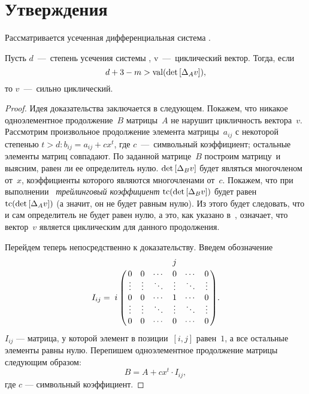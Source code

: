 \section{Утверждения}

Рассматривается усеченная дифференциальная система .

\begin{proposition}
Пусть $d$~---~степень усечения системы , v~---~циклический вектор. Тогда, если
\begin{equation}
	d + 3 - m > \mathop{\rm val}(\mathop{\rm det}\text{$ [\Delta_A v] $}),
	\label{d3m}
\end{equation}
то $v$~---~сильно циклический.

\end{proposition}

\begin{proof}

Идея доказательства заключается в следующем.
Покажем, что никакое одноэлементное продолжение~$B$ матрицы~$A$ не нарушит цикличность вектора~$v$.
Рассмотрим произвольное продолжение элемента матрицы~$a_{ij}$ с некоторой степенью $t > d: b_{ij} = a_{ij} + cx^t$,
где $c$~---~символьный коэффициент; остальные элементы матриц совпадают.
По заданной матрице~$B$ построим матрицу~\diffMatrix[B] и выясним, равен ли ее определитель нулю.
$\mathop{\rm det} \text{$ [\Delta_B v] $}$ будет являться многочленом от~$x$, коэффициенты которого являются многочленами от~$c$.
Покажем, что при выполнении~ \textit{трейлинговый коэффициент} $\mathop{\rm tc} (\mathop{\rm det} \text{$ [\Delta_B v] $})$ будет равен $\mathop{\rm tc} (\mathop{\rm det} \text{$ [\Delta_A v] $})$
(а значит, он не будет равным нулю).
Из этого будет следовать, что и сам определитель не будет равен нулю, а это, как указано в~, означает, что вектор~$v$ является циклическим для данного продолжения.
\medskip

Перейдем теперь непосредственно к доказательству.
Введем обозначение
\begin{equation*}
	I_{ij} = 
	\bordermatrix{
		&           &         &        & j      &        &        \cr
		&   0       & 0       & \cdots & 0      & \cdots & 0      \cr
		&   \vdots  & \vdots  & \ddots & \vdots & \ddots & \vdots \cr
		i & 0       & 0       & \cdots & 1      & \cdots & 0      \cr
		&   \vdots  & \vdots  & \ddots & \vdots & \ddots & \vdots \cr
		&   0       & 0       & \cdots & 0      & \cdots & 0      \cr
	}.
\end{equation*}
$I_{ij}$ --- матрица, у которой элемент в позиции~$[i, j]$ равен~$1$, а все остальные элементы равны нулю.
Перепишем одноэлементное продолжение матрицы следующим образом:
\begin{equation}
	B = A + cx^t \cdot I_{ij},
\end{equation}
где $c$ --- символьный коэффициент.


\end{proof}
